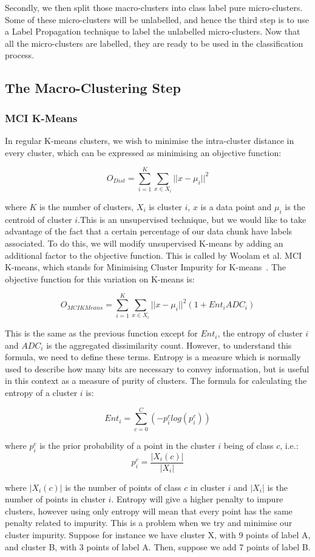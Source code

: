 \documentclass[12pt,a4paper,oneside]{report}
\begin{document}
Secondly, we then split those macro-clusters into class label pure micro-clusters. Some of these micro-clusters will be unlabelled, and hence the third step is to use a Label Propagation technique to label the unlabelled micro-clusters. Now that all the micro-clusters are labelled, they are ready to be used in the classification process. 

\subsection*{The Macro-Clustering Step}

\subsubsection*{MCI K-Means}
 In regular K-means clusters, we wish to minimise the intra-cluster distance in every cluster, which can be expressed  as minimising an objective function: 
 
 \[ O_{Dist} = \sum_{i=1}^K \sum_{x\in X_i}|| x - \mu_i||^2 \]
 
where $K$ is the number of clusters, $X_i$ is cluster $i$, $x$ is a data point and $\mu_i$ is the centroid of cluster $i$.This is an unsupervised technique, but we would like to take advantage of the fact that a certain percentage of our data chunk have labels associated. To do this, we will modify unsupervised K-means by adding an additional factor to the objective function. This is called by Woolam et al. MCI K-means, which stands for Minimising Cluster Impurity for K-means~\cite{LabStr}. The objective function for this variation on K-means is:
 
 \[ O_{MCIKMeans} = \sum_{i=1}^K \sum_{x\in X_i}|| x - \mu_i||^2(1 + Ent_iADC_i)\]

This is the same as the previous function except for $Ent_i$, the entropy of cluster $i$ and $ADC_i$ is the aggregated dissimilarity count. However, to understand this formula, we need to define these terms. 
Entropy is a measure which is normally used to describe how many bits are necessary to convey information, but is useful in this context as a measure of purity of clusters. The formula for calculating the entropy of a cluster \(i\) is:
 
\[Ent_i = \sum_{c=0}^C(-p_i^clog(p_i^c))\] 

where \(p_i^c\) is the prior probability of a point in the cluster \(i\) being of class \(c\), i.e.:
\[p_i^c = \frac{|X_i(c)|}{|X_i|}\] 

where $|X_i(c)|$ is the number of points of class $c$ in cluster $i$ and $|X_i|$ is the number of points in cluster $i$. 
Entropy will give a higher penalty to impure clusters, however using only entropy will mean that every point has the same penalty related to impurity. This is a problem when we try and minimise our cluster impurity. Suppose for instance we have cluster X, with 9 points of label A, and cluster B, with 3 points of label A. Then, suppose we add 7 points of label B. 
\end{document}
